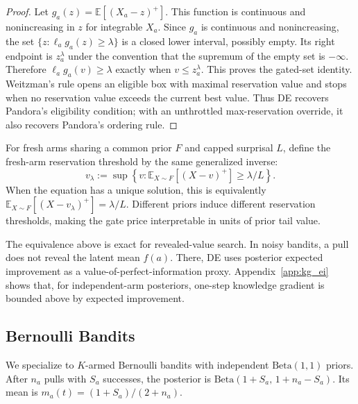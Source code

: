 \documentclass{article}
\newcommand{\E}{\mathbb{E}}
\newcommand{\surp}{\ell} %
\begin{document}
\begin{proof}
Let $g_a(z)=\E[(X_a-z)^+]$.
This function is continuous and nonincreasing in $z$ for integrable $X_a$.
Since $g_a$ is continuous and nonincreasing, the set $\{z:\surp_a g_a(z)\ge\lambda\}$ is a closed lower interval, possibly empty.
Its right endpoint is $z_a^\lambda$ under the convention that the supremum of the empty set is $-\infty$.
Therefore $\surp_a g_a(v)\ge\lambda$ exactly when $v\le z_a^\lambda$.
This proves the gated-set identity.
Weitzman's rule opens an eligible box with maximal reservation value and stops when no reservation value exceeds the current best value.
Thus DE recovers Pandora's eligibility condition; with an unthrottled max-reservation override, it also recovers Pandora's ordering rule.
\end{proof}

For fresh arms sharing a common prior $F$ and capped surprisal $L$, define the fresh-arm reservation threshold by the same generalized inverse:
\begin{equation}
\label{eq:general_reservation}
  v_\lambda
  :=
  \sup\left\{
    v:\E_{X\sim F}[(X-v)^+] \ge \lambda/L
  \right\}.
\end{equation}
When the equation has a unique solution, this is equivalently
$\E_{X\sim F}[(X-v_\lambda)^+]=\lambda/L$.
Different priors induce different reservation thresholds, making the gate price interpretable in units of prior tail value.


The equivalence above is exact for revealed-value search.
In noisy bandits, a pull does not reveal the latent mean $f(a)$.
There, DE uses posterior expected improvement as a value-of-perfect-information proxy.
Appendix~\ref{app:kg_ei} shows that, for independent-arm posteriors, one-step knowledge gradient is bounded above by expected improvement.

\subsection{Bernoulli Bandits}
\label{sec:bernoulli}

We specialize to $K$-armed Bernoulli bandits with independent $\mathrm{Beta}(1,1)$ priors.
After $n_a$ pulls with $S_a$ successes, the posterior is $\mathrm{Beta}(1+S_a,\,1+n_a-S_a)$.
Its mean is $m_a(t) = (1+S_a)/(2+n_a)$.
\end{document}
